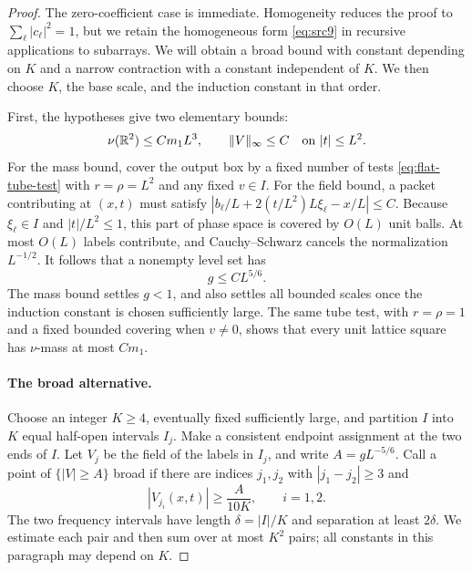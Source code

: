 \begin{proof}
The zero-coefficient case is immediate.  Homogeneity reduces the proof
to $\sum_\ell|c_\ell|^2=1$, but we retain the homogeneous form
\eqref{eq:src9} in recursive applications to subarrays.
We will obtain a broad bound with constant depending on $K$ and a
narrow contraction with a constant independent of $K$.  We then
choose $K$, the base scale, and the induction constant in that order.

First, the hypotheses give two elementary bounds:
\begin{equation}\label{eq:flat-elementary}
 \nu(\mathbb R^2)\leq C m_1L^3,\qquad \|V\|_\infty\leq C
                    \quad\text{on } |t|\leq L^2.
\end{equation}
For the mass bound, cover the output box by a fixed number of tests
\eqref{eq:flat-tube-test} with $r=\rho=L^2$ and any fixed $v\in I$.
For the field bound, a packet contributing at $(x,t)$ must satisfy
$|b_\ell/L+2(t/L^2)L\xi_\ell-x/L|\leq C$.  Because $\xi_\ell\in I$
and $|t|/L^2\leq1$, this part of phase space is covered by $O(L)$ unit
balls.  At most $O(L)$ labels contribute, and Cauchy--Schwarz cancels
the normalization $L^{-1/2}$.  It follows that a nonempty level set has
\begin{equation}\label{eq:flat-g-range}
 g\leq C L^{5/6}.
\end{equation}
The mass bound settles $g<1$, and also settles all bounded scales once
the induction constant is chosen sufficiently large.  The same tube
test, with $r=\rho=1$ and a fixed bounded covering when $v\neq0$,
shows that every unit lattice square has $\nu$-mass at most $C m_1$.

\paragraph{The broad alternative.}
Choose an integer $K\geq4$, eventually fixed sufficiently large, and
partition $I$ into $K$ equal half-open intervals $I_j$.  Make a
consistent endpoint assignment at the two ends of $I$.  Let $V_j$ be
the field of the labels in $I_j$, and write $A=gL^{-5/6}$.  Call a
point of $\{|V|\geq A\}$ broad if there are indices $j_1,j_2$ with
$|j_1-j_2|\geq3$ and
\[
 |V_{j_i}(x,t)|\geq \frac{A}{10K},\qquad i=1,2.
\]
The two frequency intervals have length $\delta=|I|/K$ and separation
at least $2\delta$.  We estimate each pair and then sum over at most
$K^2$ pairs; all constants in this paragraph may depend on $K$.


\end{proof}
